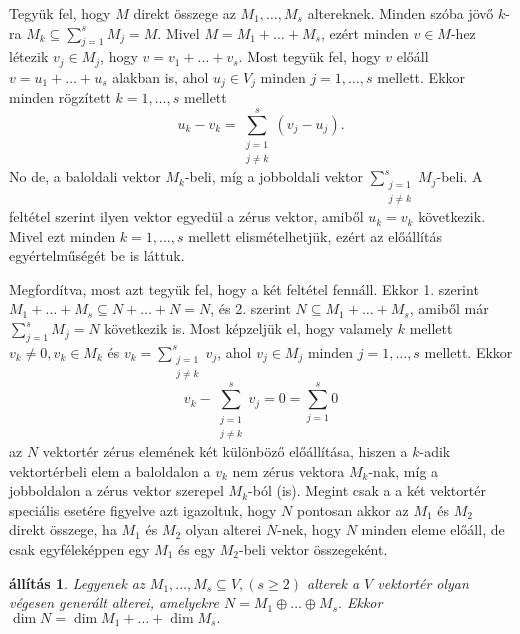 \documentclass[9pt, showtrims]{memoir}
\makeatletter
\renewenvironment{proof}[1][\proofname]
    {\par\pushQED{\qed}%
    \normalfont \topsep6\p@\@plus6\p@\relax
    \trivlist
    \item[\hskip\labelsep
        \itshape
    #1\@addpunct{:}]\ignorespaces}
    {\popQED\endtrivlist\@endpefalse}
\theoremstyle{plain}
\newtheorem{proposition}{állítás}[section]
\theoremstyle{remark}
\theoremstyle{definition}
\makeatother
\begin{document}
\begin{proof}
    Tegyük fel, hogy $M$ direkt összege az $M_1,\dots,M_s$ altereknek.
    Minden szóba jövő $k$-ra $M_k\subseteq\sum_{j=1}^sM_j=M.$
    Mivel $M=M_1+\dots+M_s$, ezért minden $v\in M$-hez létezik $v_j\in M_j$, hogy 
    $v=v_1+\dots+v_s$.
    Most tegyük fel, hogy $v$ előáll $v=u_1+\dots+u_s$ alakban is, 
    ahol $u_j\in V_j$ minden $j=1,\dots,s$ mellett.
    Ekkor minden rögzített $k=1,\dots,s$ mellett
    \[
        u_k-v_k=\sum_{\substack{j=1\\j\neq k}}^s\left( v_j-u_j \right).
    \]
    No de, a baloldali vektor $M_k$-beli, 
    míg a jobboldali vektor $\sum_{\substack{j=1\\j\neq k}}^sM_j$-beli.
    A feltétel szerint ilyen vektor egyedül a zérus vektor, 
    amiből $u_k=v_k$ következik. 
    Mivel ezt minden $k=1,\dots,s$ mellett elismételhetjük,
    ezért az előállítás egyértelműségét be is láttuk.

    Megfordítva,
    most azt tegyük fel, hogy a két feltétel fennáll.
    Ekkor 1. szerint $M_1+\dots+M_s\subseteq N+\dots+N=N$,
    és 2. szerint $N\subseteq M_1+\dots+M_s$,
    amiből már
    \begin{math}
        \sum_{j=1}^sM_j=N
    \end{math}
    következik is.
    Most képzeljük el, 
    hogy valamely $k$ mellett $v_k\neq 0, v_k\in M_k$ 
    és 
    $v_k=\sum_{\substack{j=1\\j\neq k}}^sv_j$, ahol $v_j\in M_j$ minden $j=1,\dots,s$ mellett.
    Ekkor 
    \[
        v_k-\sum_{\substack{j=1\\j\neq k}}^sv_j
        =
        0
        =
        \sum_{j=1}^s 0
    \]
    az $N$ vektortér zérus elemének két különböző előállítása,
    hiszen a $k$-adik vektortérbeli elem a baloldalon a $v_k$ nem zérus vektora $M_k$-nak,
    míg a jobboldalon a zérus vektor szerepel $M_k$-ból (is).
\end{proof}
Megint csak a a két vektortér speciális esetére figyelve 
azt igazoltuk, hogy $N$ pontosan akkor az $M_1$ és $M_2$ direkt összege,
ha $M_1$ és $M_2$ olyan alterei $N$-nek, hogy $N$ minden eleme előáll,
de csak egyféleképpen egy $M_1$ és egy $M_2$-beli vektor összegeként.
\begin{proposition}\label{pr:drosszeg}
    Legyenek az $M_1,\dots,M_s\subseteq V, (s\geq 2)$ alterek a $V$ vektortér olyan végesen generált alterei,
    amelyekre 
    \(
        N=M_1\oplus\dots\oplus M_s.
    \)
    Ekkor 
    \(
        \dim N=
        \dim M_1+\dots+\dim M_s.
    \)
\end{proposition}
\end{document}
